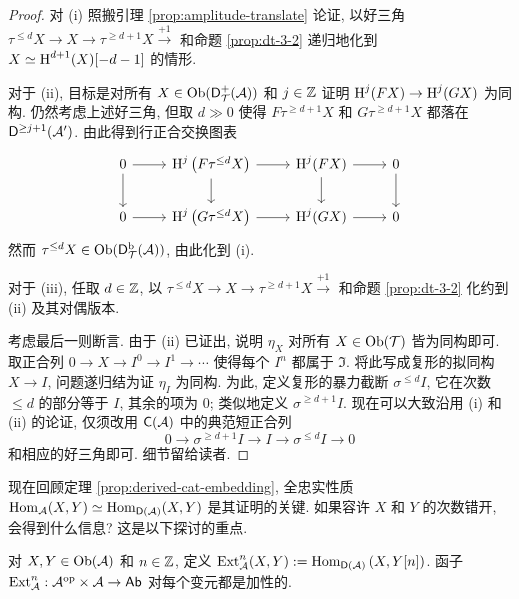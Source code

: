 \begin{proof}
	对 (i) 照搬引理 \ref{prop:amplitude-translate} 论证, 以好三角 $\tau^{\leq d} X \to X \to \tau^{\geq d+1} X \xrightarrow{+1}$ 和命题 \ref{prop:dt-3-2} 递归地化到 $X \simeq \operatorname{H}^{d+1}(X)[-d-1]$ 的情形.
	
	对于 (ii), 目标是对所有 $X \in \operatorname{Ob}(\mathsf{D}^+_{\mathcal{T}}(\mathcal{A}))$ 和 $j \in \mathbb{Z}$ 证明 $\operatorname{H}^j(FX) \to \operatorname{H}^j(GX)$ 为同构. 仍然考虑上述好三角, 但取 $d \gg 0$ 使得 $F\tau^{\geq d+1} X$ 和 $G\tau^{\geq d+1} X$ 都落在 $\mathsf{D}^{\geq j+1}(\mathcal{A}')$. 由此得到行正合交换图表
	\[\begin{tikzcd}
		0 \arrow[r] \arrow[d] & \Hm^j\left( F\tau^{\leq d} X \right) \arrow[r] \arrow[d] & \Hm^j(FX) \arrow[d] \arrow[r] & 0 \arrow[d] \\
		0 \arrow[r] & \Hm^j\left( G\tau^{\leq d} X \right) \arrow[r] & \Hm^j(GX) \arrow[r] & 0
	\end{tikzcd}\]
	然而 $\tau^{\leq d} X \in \operatorname{Ob}(\mathsf{D}^{\mathrm{b}}_{\mathcal{T}}(\mathcal{A}))$, 由此化到 (i).

	对于 (iii), 任取 $d \in \mathbb{Z}$, 以 $\tau^{\leq d} X \to X \to \tau^{\geq d+1} X \xrightarrow{+1}$ 和命题 \ref{prop:dt-3-2} 化约到 (ii) 及其对偶版本.
	
	考虑最后一则断言. 由于 (ii) 已证出, 说明 $\eta_X$ 对所有 $X \in \operatorname{Ob}(\mathcal{T})$ 皆为同构即可. 取正合列 $0 \to X \to I^0 \to I^1 \to \cdots$ 使得每个 $I^n$ 都属于 $\mathfrak{I}$. 将此写成复形的拟同构 $X \to I$, 问题遂归结为证 $\eta_I$ 为同构. 为此, 定义复形的暴力截断 $\sigma^{\leq d} I$, 它在次数 $\leq d$ 的部分等于 $I$, 其余的项为 $0$; 类似地定义 $\sigma^{\geq d+1} I$. 现在可以大致沿用 (i) 和 (ii) 的论证, 仅须改用 $\mathsf{C}(\mathcal{A})$ 中的典范短正合列
	\[ 0 \to \sigma^{\geq d+1} I \to I \to \sigma^{\leq d} I \to 0 \]
	和相应的好三角即可. 细节留给读者.
\end{proof}

现在回顾定理 \ref{prop:derived-cat-embedding}, 全忠实性质 $\operatorname{Hom}_{\mathcal{A}}(X, Y) \simeq \operatorname{Hom}_{\mathsf{D}(\mathcal{A})}(X, Y)$ 是其证明的关键. 如果容许 $X$ 和 $Y$ 的次数错开, 会得到什么信息? 这是以下探讨的重点.

\begin{definition}\label{def:Ext-general}
	对 $X, Y \in \operatorname{Ob}(\mathcal{A})$ 和 $n \in \mathbb{Z}$, 定义 $\operatorname{Ext}^n_{\mathcal{A}}(X, Y) := \operatorname{Hom}_{\mathsf{D}(\mathcal{A})}\left(X, Y[n] \right)$. 函子 $\operatorname{Ext}^n_{\mathcal{A}}: \mathcal{A}^{\operatorname{op}} \times \mathcal{A} \to \mathsf{Ab}$ 对每个变元都是加性的.
\end{definition}

